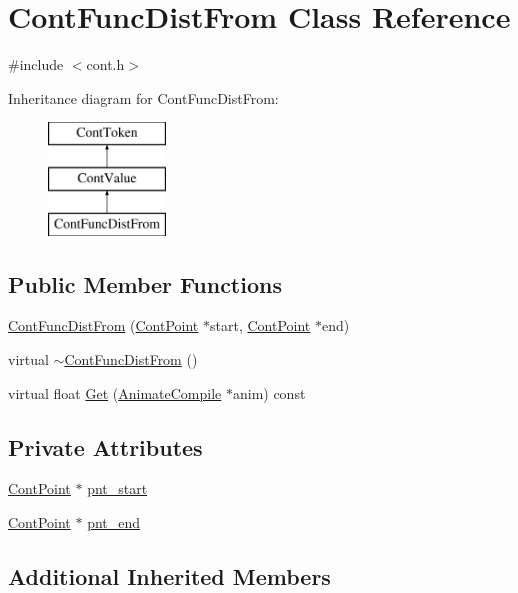 \hypertarget{a00055}{\section{Cont\-Func\-Dist\-From Class Reference}
\label{a00055}
}


{\ttfamily \#include $<$cont.\-h$>$}

Inheritance diagram for Cont\-Func\-Dist\-From\-:\begin{figure}[H]
\begin{center}
\leavevmode
\includegraphics[height=3.000000cm]{a00055}
\end{center}
\end{figure}
\subsection*{Public Member Functions}
\begin{DoxyCompactItemize}
\item 
\hyperlink{a00055_abd7324bac1a52e3bf7b6701d25a8dbcd}{Cont\-Func\-Dist\-From} (\hyperlink{a00062}{Cont\-Point} $\ast$start, \hyperlink{a00062}{Cont\-Point} $\ast$end)
\item 
virtual \hyperlink{a00055_a5658a543adb8b5e1d2ca6c754f2aa271}{$\sim$\-Cont\-Func\-Dist\-From} ()
\item 
virtual float \hyperlink{a00055_a152f3bb0dc7650622079af59b55b4a6c}{Get} (\hyperlink{a00007}{Animate\-Compile} $\ast$anim) const 
\end{DoxyCompactItemize}
\subsection*{Private Attributes}
\begin{DoxyCompactItemize}
\item 
\hyperlink{a00062}{Cont\-Point} $\ast$ \hyperlink{a00055_a25338c27e80b5da31dcfd66fab8301b0}{pnt\-\_\-start}
\item 
\hyperlink{a00062}{Cont\-Point} $\ast$ \hyperlink{a00055_af5ec896aa9096b288b261444c42f0e54}{pnt\-\_\-end}
\end{DoxyCompactItemize}
\subsection*{Additional Inherited Members}


